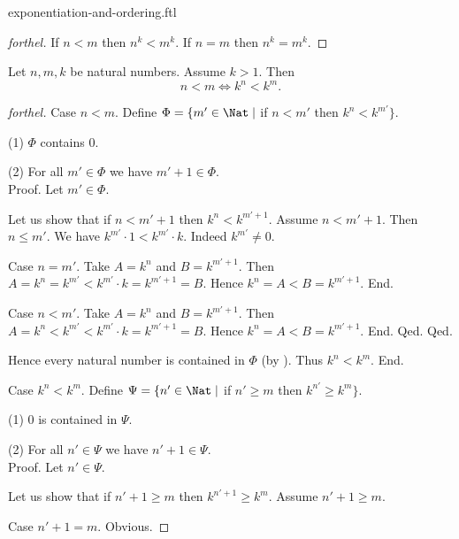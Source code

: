 \documentclass{naproche-library}
\begin{document}
\begin{smodule}{exponentiation-and-ordering.ftl}
\begin{proof}[forthel]
    If $n < m$ then $n^{k} < m^{k}$.
    If $n = m$ then $n^{k} = m^{k}$.
  \end{proof}

  \begin{proposition}[forthel,id=ARITHMETIC_09_3349764703780864,printid]
    Let $n, m, k$ be natural numbers.
    Assume $k > 1$.
    Then \[ n < m \iff k^{n} < k^{m}. \]
  \end{proposition}
  \begin{proof}[forthel]
    Case $n < m$.
      Define $\Phi = \{ m' \in \Nat \mid$ if $n < m'$ then $k^{n} < k^{m'} \}$.

      (1) $\Phi$ contains $0$.

      (2) For all $m' \in \Phi$ we have $m' + 1 \in \Phi$. \\
      Proof.
        Let $m' \in \Phi$.

        Let us show that if $n < m' + 1$ then $k^{n} < k^{m' + 1}$.
          Assume $n < m' + 1$.
          Then $n \leq m'$.
          We have $k^{m'} \cdot 1 < k^{m'} \cdot k$.
          Indeed $k^{m'} \neq 0$.

          Case $n = m'$.
            Take $A = k^{n}$ and $B = k^{m' + 1}$. %
            Then $A
              = k^{n}
              = k^{m'}
              < k^{m'} \cdot k
              = k^{m' + 1}
              = B$.
            Hence $k^{n} = A < B = k^{m' + 1}$.
          End.

          Case $n < m'$.
            Take $A = k^{n}$ and $B = k^{m' + 1}$. %
            Then $A
              = k^{n}
              < k^{m'}
              < k^{m'} \cdot k
              = k^{m' + 1}
              = B$.
            Hence $k^{n} = A < B = k^{m' + 1}$.
          End.
        Qed.
      Qed.

      Hence every natural number is contained in $\Phi$ (by ).
      Thus $k^{n} < k^{m}$.
    End.

    Case $k^{n} < k^{m}$.
      Define $\Psi = \{ n' \in \Nat \mid$ if $n' \geq m$ then
      $k^{n'} \geq k^{m} \}$.

      (1) $0$ is contained in $\Psi$.

      (2) For all $n' \in \Psi$ we have $n' + 1 \in \Psi$. \\
      Proof.
        Let $n' \in \Psi$.

        Let us show that if $n' + 1 \geq m$ then $k^{n' + 1} \geq k^{m}$.
          Assume $n' + 1 \geq m$.

          Case $n' + 1 = m$. Obvious.


\end{proof}
\end{smodule}
\end{document}
